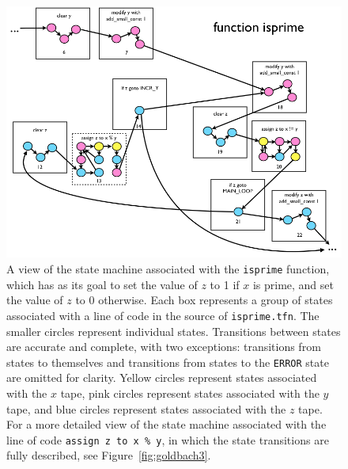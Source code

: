 \begin{figure} 
\begin{center} 
\includegraphics[scale=0.4]{figs/goldbach2.png} 
\caption{A view of the state machine associated with the \texttt{isprime} function, which has as its goal to set the value of $z$ to 1 if $x$ is prime, and set the value of $z$ to 0 otherwise. Each box represents a group of states associated with a line of code in the source of \texttt{isprime.tfn}. The smaller circles represent individual states. Transitions between states are accurate and complete, with two exceptions: transitions from states to themselves and transitions from states to the \texttt{ERROR} state are omitted for clarity. Yellow circles represent states associated with the $x$ tape, pink circles represent states associated with the $y$ tape, and blue circles represent states associated with the $z$ tape. For a more detailed view of the state machine associated with the line of code \texttt{assign z to x \% y}, in which the state transitions are fully described, see Figure~\ref{fig:goldbach3}. \label{fig:goldbach2}}
\end{center} 
\end{figure}

